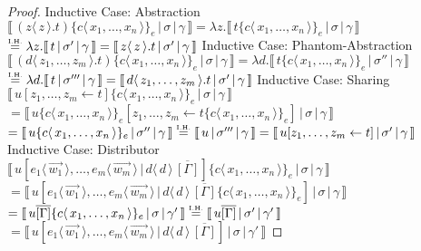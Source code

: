 \documentclass[a4paper,UKenglish,cleveref, autoref]{lipics-v2019}
\newcommand{\abs}[2]{\lambda #1 . #2}
\newcommand{\fake}[3]{#1 \langle \, #2 \, \rangle . #3}
\newcommand{\share}[3]{#1 [#2 \leftarrow #3]}
\newcommand{\dist}[5]{#1 [ #2 \, \vert \, \fakedist{#4}{#5} \, #3 ]}
\newcommand{\fakedist}[2]{#1 \langle \, #2 \, \rangle}
\newcommand{\exor}[3]{#1 \{ \fakedist{#2}{#3} \}_{e}}
\newcommand{\readbackwmap}[3]{\llbracket \, #1 \, \vert \, #2 \, \vert \, #3  \, \rrbracket }
\newcommand{\IH}{\stackrel{\hbox{\tiny I.H.}}{\hbox{=}}}
\begin{document}
\begin{proof}
\newline
Inductive Case: Abstraction
\newline
$\readbackwmap{(\fake{z}{z}{t}) \exor{}{c}{x_{1}, \dots, x_{n}} }{\sigma}{\gamma} = \abs{z}{\readbackwmap{t  \exor{}{c}{x_{1}, \dots, x_{n}}}{\sigma}{\gamma}}$
\newline
$\IH \abs{z}{\readbackwmap{t}{\sigma'}{\gamma}} = \readbackwmap{\fake{z}{z}{t}}{\sigma'}{\gamma}$
\newline
\newline
Inductive Case: Phantom-Abstraction
\newline
$\readbackwmap{(\fake{d}{z_{1}, \dots, z_{m}}{t}) \exor{}{c}{x_{1}, \dots, x_{n}} }{\sigma}{\gamma} = \abs{d}{\readbackwmap{t  \exor{}{c}{x_{1}, \dots, x_{n}}}{\sigma''}{\gamma}}$
\newline
$\IH \abs{d}{\readbackwmap{t}{\sigma'''}{\gamma}} = \readbackwmap{\fake{d}{z_{1}, \dots, z_{m}}{t}}{\sigma'}{\gamma}$
\newline
\newline
Inductive Case: Sharing
\newline
$\readbackwmap{\share{u}{z_{1}, \dots, z_{m}}{t} \exor{}{c}{x_{1}, \dots, x_{n}} }{\sigma}{\gamma}$
\newline
$= \readbackwmap{\share{u \exor{}{c}{x_{1}, \dots, x_{n}}}{z_{1}, \dots, z_{m}}{t \exor{}{c}{x_{1}, \dots, x_{n}}}}{\sigma}{\gamma}$
\newline
$= \readbackwmap{u \exor{}{c}{x_{1}, \dots, x_{n}} }{\sigma''}{\gamma} \IH \readbackwmap{u}{\sigma'''}{\gamma} = \readbackwmap{\share{u}{z_{1}, \dots, z_{m}}{t}}{\sigma'}{\gamma}$
\newline
\newline
Inductive Case: Distributor
\newline
$\readbackwmap{\dist{u}{\fakedist{e_{1}}{\vec{w_{1}}}, \dots, \fakedist{e_{m}}{\vec{w_{m}}}}{\overline{[\Gamma]}}{d}{d} \exor{}{c}{x_{1}, \dots, x_{n}} }{\sigma}{\gamma}$
\newline
$= \readbackwmap{\dist{u}{\fakedist{e_{1}}{\vec{w_{1}}}, \dots, \fakedist{e_{m}}{\vec{w_{m}}}}{\overline{[\Gamma]} \exor{}{c}{x_{1}, \dots, x_{n}}}{d}{d}  }{\sigma}{\gamma}$
\newline
$= \readbackwmap{u \overline{[\Gamma]} \exor{}{c}{x_{1}, \dots, x_{n}}}{\sigma}{\gamma'} \IH \readbackwmap{u \overline{[\Gamma]}}{\sigma'}{\gamma'}$
\newline
$= \readbackwmap{\dist{u}{\fakedist{e_{1}}{\vec{w_{1}}}, \dots, \fakedist{e_{m}}{\vec{w_{m}}}}{\overline{[\Gamma]}}{d}{d} }{\sigma}{\gamma'}$
\end{proof}
\end{document}
